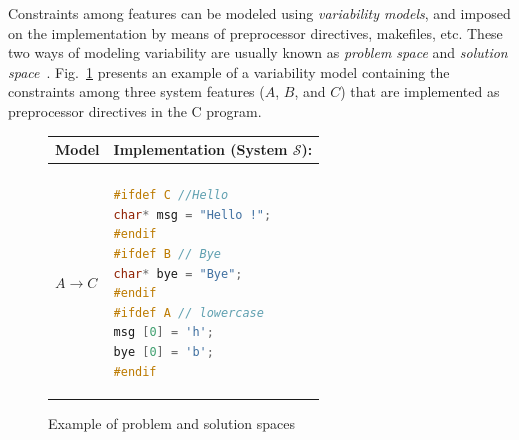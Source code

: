\begin{tikzborder}{\cite{Gargantini16:validation}}
\begin{tikzborder}{\cite{gargantini_combinatorial_2017}}
\begin{tikzborder}{\cite{garn2019}}
\begin{tikzborder}{\cite{arcaini2019achieving}}
	Constraints among features can be modeled using {\it variability models}, and imposed on the implementation by means of preprocessor directives, makefiles, etc. These two ways of modeling variability are usually known as {\it problem space} and {\it solution space}~\cite{NadiBKC14}. Fig.~\ref{fig:problSolSpaces} presents an example of a variability model containing the constraints among three system features ($A$, $B$, and $C$) that are implemented as preprocessor directives in the C program.
	\begin{figure}[!tb]
		\begin{center}
			\begin{tabular}[t]{p{25mm}p{45mm}}
				Model \m & Implementation (System $\mathcal{S}$):\\\hline 
				\begin{minipage}{25mm}
$A \rightarrow B$ \\
$A \rightarrow C$
				\end{minipage}
				&\begin{minipage}{45mm}
					\lstset{basicstyle=\linespread{0.8}\ttfamily\footnotesize,breaklines = true,columns=flexible}
					\begin{lstlisting}[language=C]
#ifdef C //Hello
char* msg = "Hello !";
#endif 
#ifdef B // Bye 
char* bye = "Bye";
#endif 
#ifdef A // lowercase 
msg [0] = 'h';
bye [0] = 'b'; 
#endif
					\end{lstlisting}
				\end{minipage}
				\\
				\hline
			\end{tabular}
		\end{center}
		\caption{Example of problem and solution spaces}
		\label{fig:problSolSpaces}
	\end{figure}
	

\end{tikzborder}
\end{tikzborder}
\end{tikzborder}
\end{tikzborder}
